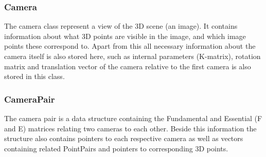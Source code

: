 \subsubsection{Camera}
The camera class represent a view of the 3D scene (an image). It contains information about what 3D points are visible in the image, and which image points these correspond to. Apart from this all necessary information about the camera itself is also stored here, such as internal parameters (K-matrix), rotation matrix and translation vector of the camera relative to the first camera is also stored in this class.

\subsubsection{CameraPair}
The camera pair is a data structure containing the Fundamental and Essential (F and E) matrices relating two cameras to each other. Beside this information the structure also contains pointers to each respective camera as well as vectors containing related PointPairs and pointers to corresponding 3D points.

